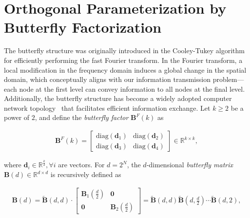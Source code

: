 \section{Orthogonal Parameterization by Butterfly Factorization}

The butterfly structure was originally introduced in the Cooley-Tukey algorithm for efficiently performing the fast Fourier transform. In the Fourier transform, a local modification in the frequency domain induces a global change in the spatial domain, which conceptually aligns with our information transmission problem—each node at the first level can convey information to all nodes at the final level. Additionally, the butterfly structure has become a widely adopted computer network topology~\cite{solihin2015fundamentals,li2011linear} that facilitates efficient information exchange. Let $k \geq 2$ be a power of $2$, and define the \emph{butterfly factor} $\bm{B}^F(k)$ as

\begin{equation}\label{eq:but_factor}
\begin{aligned}
    \bm{B}^F(k) = \begin{bmatrix}
    \text{diag}(\bm{d}_1) & \text{diag}(\bm{d}_2) \\
    \text{diag}(\bm{d}_3) & \text{diag}(\bm{d}_4)
    \end{bmatrix} \in \mathbb{R}^{k \times k},
\end{aligned}
\end{equation}

where $\bm{d}_i \in \mathbb{R}^{\frac{k}{2}}, \forall i$ are vectors. For $d = 2^N$, the $d$-dimensional \emph{butterfly matrix} $\bm{B}(d) \in \mathbb{R}^{d \times d}$ is recursively defined as

\begin{equation}
\begin{aligned}
    \bm{B}(d) = \tilde{\bm{B}}(d,d) \cdot \begin{bmatrix}
    \bm{B}_1\left(\frac{d}{2}\right) & \bm{0} \\
    \bm{0} & \bm{B}_2\left(\frac{d}{2}\right)
    \end{bmatrix} = \tilde{\bm{B}}(d,d) \tilde{\bm{B}}(d, \tfrac{d}{2}) \cdots \tilde{\bm{B}}(d, 2),
\end{aligned}
\end{equation}

